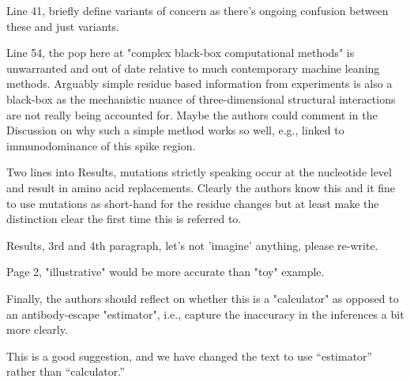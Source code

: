 \documentclass[11pt, oneside]{article}   	%
\newcommand{\response}[1]{{\color{black}#1}}
\begin{document}
Line 41, briefly define variants of concern as there's ongoing confusion between these and just variants.

Line 54, the pop here at "complex black-box computational methods" is unwarranted and out of date relative to much contemporary machine leaning methods. Arguably simple residue based information from experiments is also a black-box as the mechanistic nuance of three-dimensional structural interactions are not really being accounted for. Maybe the authors could comment in the Discussion on why such a simple method works so well, e.g., linked to immunodominance of this spike region.

Two lines into Results, mutations strictly speaking occur at the nucleotide level and result in amino acid replacements. Clearly the authors know this and it fine to use mutations as short-hand for the residue changes but at least make the distinction clear the first time this is referred to.

Results, 3rd and 4th paragraph, let's not 'imagine' anything, please re-write.

Page 2, "illustrative" would be more accurate than "toy" example.

Finally, the authors should reflect on whether this is a "calculator" as opposed to an antibody-escape "estimator", i.e., capture the inaccuracy in the inferences a bit more clearly.

\response{This is a good suggestion, and we have changed the text to use ``estimator'' rather than ``calculator.''}

\color{black}

{\small

}
\end{document}
